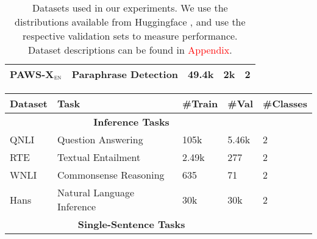 \begin{table*}[t]
\begin{tabular}{lllll}
  PAWS-X$_{\textsc{en}}$ \citep{yang-etal-2019-paws} & Paraphrase Detection & 49.4k & 2k & 2 \\
  \bottomrule
\end{tabular}
\caption{\label{table:datasets} Datasets used in our experiments. We use the distributions available from Huggingface \citep{lhoest-etal-2021-datasets}, and use the respective validation sets to measure performance. Dataset descriptions can be found in \textcolor{red}{Appendix}.}
\end{table*}
\fi

\iffalse
\begin{table*}[t]
\centering
\begin{tabular}{lllll}
  \toprule
  \textbf{Dataset} & \textbf{Task} & \textbf{\#Train} & \textbf{\#Val} & \textbf{\#Classes} \\
  \midrule
  \multicolumn{4}{c}{\textbf{Inference Tasks}} \\
  \midrule
  QNLI \citep{wang-etal-2018-glue} & Question Answering & 105k & 5.46k & 2\\
  RTE \tablefootnote{\citep{dagan2006pascal, bar2006second, giampiccolo2007third, bentivogli2009fifth}} & Textual Entailment & 2.49k & 277 & 2 \\
  WNLI \citep{levesque2011winograd} & Commonsense Reasoning & 635 & 71 & 2 \\
  Hans \citep{DBLP:journals/corr/abs-1902-01007} & Natural Language Inference & 30k & 30k & 2 \\
  \midrule
  \multicolumn{4}{c}{\textbf{Single-Sentence Tasks}} \\

\end{tabular}
\end{table*}

